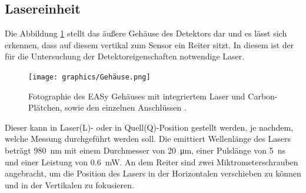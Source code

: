 \subsection{Lasereinheit}
\label{sec:Lasereinheit}
Die Abbildung \ref{fig:Gehäuse} stellt das äußere Gehäuse des Detektors dar und es lässt sich erkennen, dass auf diesem vertikal zum Sensor ein Reiter sitzt. In diesem ist der für die Untersuchung der Detektoreigenschaften notwendige Laser.
\begin{figure}[htb]
  \centering
  \texttt{[image: graphics/Gehäuse.png]}
  \caption{Fotographie des EASy Gehäuses mit integriertem Laser und Carbon-Plätchen,
  sowie den einzelnen Anschlüssen \cite{anleitung}.}
  \label{fig:Gehäuse}
\end{figure}
Dieser kann in Laser(L)- oder in Quell(Q)-Position
gestellt werden, je nachdem, welche Messung durchgeführt werden soll.
Die emittiert Wellenlänge des Lasers beträgt \SI{980}{\nano\meter}
mit einem Durchmesser von \SI{20}{\micro\meter}, einer Pulslänge von
\SI{5}{\nano\second} und einer Leistung von \SI{0.6}{\milli\watt}.
An dem Reiter sind zwei Miktrometerschrauben angebracht, um die Position des Lasers in der Horizontalen verschieben zu können und in der Vertikalen zu fokusieren.

\FloatBarrier
